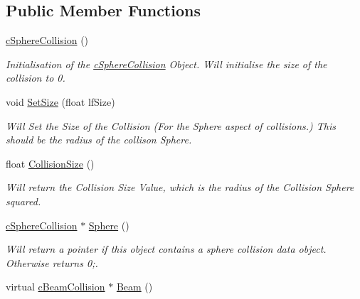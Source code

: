 \subsection*{Public Member Functions}
\begin{DoxyCompactItemize}
\item 
\hypertarget{classc_sphere_collision_a1bf8cc6c5c448614f770cd4e20490672}{
\hyperlink{classc_sphere_collision_a1bf8cc6c5c448614f770cd4e20490672}{cSphereCollision} ()}
\label{classc_sphere_collision_a1bf8cc6c5c448614f770cd4e20490672}

\begin{DoxyCompactList}\small\item\em Initialisation of the \hyperlink{classc_sphere_collision}{cSphereCollision} Object. Will initialise the size of the collision to 0. \end{DoxyCompactList}\item 
\hypertarget{classc_sphere_collision_ae4380fc994c031dbf950ab3dd9a95de7}{
void \hyperlink{classc_sphere_collision_ae4380fc994c031dbf950ab3dd9a95de7}{SetSize} (float lfSize)}
\label{classc_sphere_collision_ae4380fc994c031dbf950ab3dd9a95de7}

\begin{DoxyCompactList}\small\item\em Will Set the Size of the Collision (For the Sphere aspect of collisions.) This should be the radius of the collison Sphere. \end{DoxyCompactList}\item 
\hypertarget{classc_sphere_collision_aa06ac2f2047589d7d5d3b42500324dd5}{
float \hyperlink{classc_sphere_collision_aa06ac2f2047589d7d5d3b42500324dd5}{CollisionSize} ()}
\label{classc_sphere_collision_aa06ac2f2047589d7d5d3b42500324dd5}

\begin{DoxyCompactList}\small\item\em Will return the Collision Size Value, which is the radius of the Collision Sphere squared. \end{DoxyCompactList}\item 
\hypertarget{classc_sphere_collision_a901bc0b42bdb8acb82a9fad1dbee430a}{
\hyperlink{classc_sphere_collision}{cSphereCollision} $\ast$ \hyperlink{classc_sphere_collision_a901bc0b42bdb8acb82a9fad1dbee430a}{Sphere} ()}
\label{classc_sphere_collision_a901bc0b42bdb8acb82a9fad1dbee430a}

\begin{DoxyCompactList}\small\item\em Will return a pointer if this object contains a sphere collision data object. Otherwise returns 0;. \end{DoxyCompactList}\item 
\hypertarget{classc_sphere_collision_aa62def09d3057268faba28e2d9a4274d}{
virtual \hyperlink{classc_beam_collision}{cBeamCollision} $\ast$ \hyperlink{classc_sphere_collision_aa62def09d3057268faba28e2d9a4274d}{Beam} ()}
\label{classc_sphere_collision_aa62def09d3057268faba28e2d9a4274d}


\end{DoxyCompactItemize}
